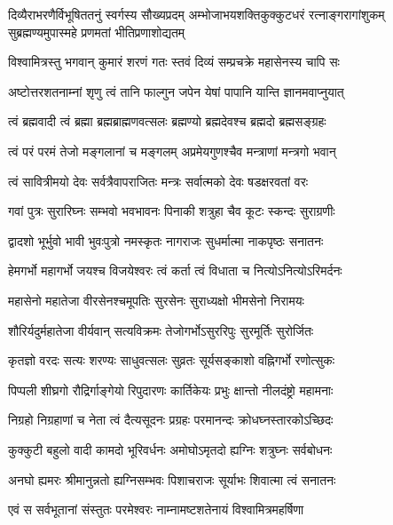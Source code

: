 
{दिव्यैराभरणैर्विभूषिततनुं स्वर्गस्य सौख्यप्रदम्}
{अम्भोजाभयशक्तिकुक्कुटधरं रत्नाङ्गरागांशुकम्}
{सुब्रह्मण्यमुपास्महे प्रणमतां भीतिप्रणाशोद्यतम्}

\nopagebreak[4]
\twolineshloka
{विश्वामित्रस्तु भगवान् कुमारं शरणं गतः}
{स्तवं दिव्यं सम्प्रचक्रे महासेनस्य चापि सः}

\twolineshloka
{अष्टोत्तरशतनाम्नां शृणु त्वं तानि फाल्गुन}
{जपेन येषां पापानि यान्ति ज्ञानमवाप्नुयात्}

\twolineshloka
{त्वं ब्रह्मवादी त्वं ब्रह्मा ब्रह्मब्राह्मणवत्सलः}
{ब्रह्मण्यो ब्रह्मदेवश्च ब्रह्मदो ब्रह्मसङ्ग्रहः}

\twolineshloka
{त्वं परं परमं तेजो मङ्गलानां च मङ्गलम्}
{अप्रमेयगुणश्चैव मन्त्राणां मन्त्रगो भवान्}

\twolineshloka
{त्वं सावित्रीमयो देवः सर्वत्रैवापराजितः}
{मन्त्रः सर्वात्मको देवः षडक्षरवतां वरः}

\twolineshloka
{गवां पुत्रः सुरारिघ्नः सम्भवो भवभावनः}
{पिनाकी शत्रुहा चैव कूटः स्कन्दः सुराग्रणीः}

\twolineshloka
{द्वादशो भूर्भुवो भावी भुवःपुत्रो नमस्कृतः}
{नागराजः सुधर्मात्मा नाकपृष्ठः सनातनः}

\twolineshloka
{हेमगर्भो महागर्भो जयश्च विजयेश्वरः}
{त्वं कर्ता त्वं विधाता च नित्योऽनित्योऽरिमर्दनः}

\twolineshloka
{महासेनो महातेजा वीरसेनश्चमूपतिः}
{सुरसेनः सुराध्यक्षो भीमसेनो निरामयः}

\twolineshloka
{शौरिर्यदुर्महातेजा वीर्यवान् सत्यविक्रमः}
{तेजोगर्भोऽसुररिपुः सुरमूर्तिः सुरोर्जितः}

\twolineshloka
{कृतज्ञो वरदः सत्यः शरण्यः साधुवत्सलः}
{सुव्रतः सूर्यसङ्काशो वह्निगर्भो रणोत्सुकः}

\twolineshloka
{पिप्पली शीघ्रगो रौद्रिर्गाङ्गेयो रिपुदारणः}
{कार्तिकेयः प्रभुः क्षान्तो नीलदंष्ट्रो महामनाः}

\twolineshloka
{निग्रहो निग्रहाणां च नेता त्वं दैत्यसूदनः}
{प्रग्रहः परमानन्दः क्रोधघ्नस्तारकोऽच्छिदः}

\twolineshloka
{कुक्कुटी बहुलो वादी कामदो भूरिवर्धनः}
{अमोघोऽमृतदो ह्यग्निः शत्रुघ्नः सर्वबोधनः}

\twolineshloka
{अनघो ह्यमरः श्रीमानुन्नतो ह्यग्निसम्भवः}
{पिशाचराजः सूर्याभः शिवात्मा त्वं सनातनः}

\twolineshloka
{एवं स सर्वभूतानां संस्तुतः परमेश्वरः}
{नाम्नामष्टशतेनायं विश्वामित्रमहर्षिणा}

